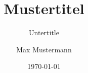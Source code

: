 \author{
	Max Mustermann
}
\titlehead{Fachbereich}
\subject{Grund der Arbeit}
\title{Mustertitel}
\subtitle{Untertitle}
\date{\today}

